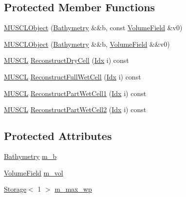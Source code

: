 \subsection*{Protected Member Functions}
\begin{DoxyCompactItemize}
\item 
\hyperlink{structMUSCLObject_a481dc01556085bc96bea8a87c9ffb80f}{M\+U\+S\+C\+L\+Object} (\hyperlink{structBathymetry}{Bathymetry} \&\&b, const \hyperlink{ValueField_8h_a329043a10c46a8722ea79ba24fe40f97}{Volume\+Field} \&v0)
\item 
\hyperlink{structMUSCLObject_a66671ff223b2d645758754ba4122801b}{M\+U\+S\+C\+L\+Object} (\hyperlink{structBathymetry}{Bathymetry} \&\&b, \hyperlink{ValueField_8h_a329043a10c46a8722ea79ba24fe40f97}{Volume\+Field} \&\&v0)
\item 
\hyperlink{structMUSCLObject_1_1MUSCL}{M\+U\+S\+CL} \hyperlink{structMUSCLObject_addbf4dabcb3c632f5550cb38db0bd1cd}{Reconstruct\+Dry\+Cell} (\hyperlink{Includes_8h_ae78891cd308078a2f5f9e7193065c805}{Idx} i) const
\item 
\hyperlink{structMUSCLObject_1_1MUSCL}{M\+U\+S\+CL} \hyperlink{structMUSCLObject_a529e679b99f1bc7daf3db9aa1389b1fe}{Reconstruct\+Full\+Wet\+Cell} (\hyperlink{Includes_8h_ae78891cd308078a2f5f9e7193065c805}{Idx} i) const
\item 
\hyperlink{structMUSCLObject_1_1MUSCL}{M\+U\+S\+CL} \hyperlink{structMUSCLObject_ae56f660d7839258ac68b33e18123e31e}{Reconstruct\+Part\+Wet\+Cell1} (\hyperlink{Includes_8h_ae78891cd308078a2f5f9e7193065c805}{Idx} i) const
\item 
\hyperlink{structMUSCLObject_1_1MUSCL}{M\+U\+S\+CL} \hyperlink{structMUSCLObject_a3d2b47def9f33ca29cd5789895e64bb8}{Reconstruct\+Part\+Wet\+Cell2} (\hyperlink{Includes_8h_ae78891cd308078a2f5f9e7193065c805}{Idx} i) const
\end{DoxyCompactItemize}
\subsection*{Protected Attributes}
\begin{DoxyCompactItemize}
\item 
\hyperlink{structBathymetry}{Bathymetry} \hyperlink{structMUSCLObject_a87718427051d5e31fea3858c534b8616}{m\+\_\+b}
\item 
\hyperlink{ValueField_8h_a329043a10c46a8722ea79ba24fe40f97}{Volume\+Field} \hyperlink{structMUSCLObject_ab01f05c398ad6379881a5c75401c85e1}{m\+\_\+vol}
\item 
\hyperlink{Includes_8h_ae7d375db701e28425a3faea2827f134b}{Storage}$<$ 1 $>$ \hyperlink{structMUSCLObject_a51fb4420efee42e415b49bca63d40742}{m\+\_\+max\+\_\+wp}
\end{DoxyCompactItemize}


